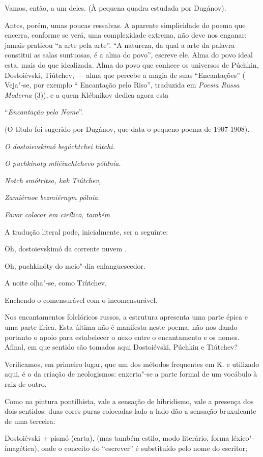 Vamos, então, a um deles. (À pequena quadra estudada por Dugánov).

Antes, porém, umas poucas ressalvas. A aparente simplicidade do poema
que encerra, conforme se verá, uma complexidade extrema, não deve nos
enganar: jamais  praticou ``a arte pela arte''. ``A natureza, da qual
a arte da palavra constitui as salas suntuosas, é a alma do povo'',
escreve ele. Alma do povo ideal esta, mais do que idealizada. Alma do
povo que conhece os universos de Púchkin, Dostoiévski, Tiútchev, --- alma
que percebe a magia de suas ``Encantações'' ( Veja"-se, por exemplo ``
Encantação pelo Riso'', traduzida em \emph{Poesia Russa Moderna} (3)), e
a quem Klébnikov dedica agora esta

``\emph{Encantação pelo Nome}''.

(O título foi sugerido por Dugánov, que data o pequeno poema de
1907-1908).

\emph{O dostoievskimó begúchtchei tútchi.}

\emph{O puchkinoty mliéiuchtchevo póldnia.}

\emph{Notch smótritsa, kak Tiútchev,}

\emph{Zamiérnoe bezmiérnym pólnia.}

\emph{Favor colocar em cirílico, também}

A tradução literal pode, inicialmente, ser a seguinte:

Oh, dostoievskimó da corrente nuvem .

Oh, puchkinóty do meio"-dia enlanguescedor.

A noite olha"-se, como Tiútchev,

Enchendo o comensurável com o incomensurável.

Nos encantamentos folclóricos russos, a estrutura apresenta uma parte
épica e uma parte lírica. Esta última não é manifesta neste poema, não
nos dando portanto o apoio para estabelecer o nexo entre o encantamento
e os nomes. Afinal, em que sentido são tomados aqui Dostoiévski, Púchkin
e Tiútchev?

Verificamos, em primeiro lugar, que um dos métodos frequentes em K. e
utilizado aqui, é o da criação de neologismos: enxerta"-se a parte formal
de um vocábulo à raiz de outro.

Como na pintura pontilhista, vale a sensação de hibridismo, vale a
presença dos dois sentidos: duas cores puras colocadas lado a lado dão a
sensação bruxuleante de uma terceira:

Dostoiévski + pismó (carta), (mas também estilo, modo literário, forma
léxico"-imagética), onde o conceito do ``escrever'' é substituído pelo
nome do escritor;

